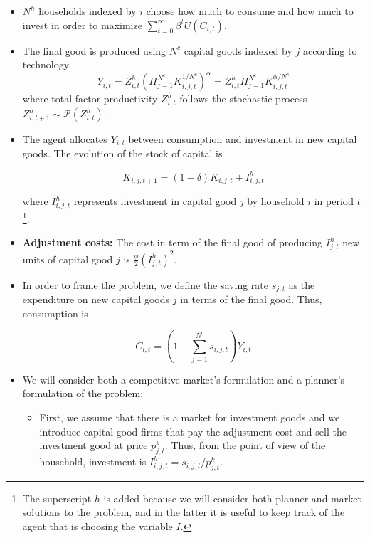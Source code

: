 \documentclass[11pt]{article}
\numberwithin{equation}{section}
\begin{document}
\begin{itemize}
	\item $N^h$ households indexed by $i$ choose how much to consume and how much to invest in order to maximize $\sum_{t=0}^{\infty} \beta^t U(C_{i,t})$.\medskip
	
	\item The final good is produced using $N^c$ capital goods indexed by $j$ according to technology $$Y_{i,t}=Z^h_{i,t} \left(\Pi_{j=1}^{N^c} K_{i,j,t}^{1/N^c} \right)^{\alpha} = Z^h_{i,t} \Pi_{j=1}^{N^c} K_{i,j,t}^{\alpha/N^c}$$  where total factor productivity $Z^h_{i,t}$ follows the stochastic process $Z^h_{i,t+1} \sim \mathcal P(Z^h_{i,t})$. \medskip
	
	\item The agent allocates $Y_{i,t}$ between consumption and investment in new capital goods. The evolution of the stock of capital is 
	
	$$K_{i,j,t+1} = (1-\delta) K_{i,j,t} + I^h_{i,j,t}$$ 
	
	where $I^h_{i,j,t}$ represents investment in capital good $j$ by household $i$ in period $t$\footnote{The superscript $h$ is added because we will consider both planner and market solutions to the problem, and in the latter it is useful to keep track of the agent that is choosing the variable $I$.}. 
	
	\item \textbf{Adjustment costs:} The cost in term of the final good of  producing $I^h_{j,t}$ new units of capital good $j$  is $\frac{\phi}{2} \left(I^h_{j,t}\right)^2$.  \medskip
	
	\item In order to frame the problem, we define the saving rate $s_{j,t}$ as the expenditure on new capital goods $j$ in terms of the final good. Thus, consumption is 
	
	$$C_{i,t}=(1-\sum_{j=1}^{N^c} s_{i,j,t})Y_{i,t}$$ 
	
	\item We will consider both a competitive market's formulation and a planner's formulation of the problem: 
	
	\begin{itemize}
			\item First, we assume that there is a market for investment goods and we introduce capital good firms that pay the adjustment cost and sell the investment good at price $p^k_{j,t}$. Thus, from the point of view of the household, investment is $I^h_{i,j,t} = s_{i,j,t}/p^k_{j,t}$.   \medskip
				

\end{itemize}
\end{itemize}
\end{document}
